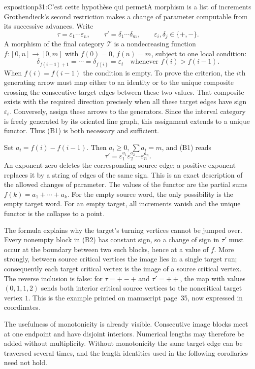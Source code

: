 \begin{dcomment}{exposition}{p31:C'est cette hypothèse qui permet}{A morphism is a list of increments}
Grothendieck's second restriction makes a change of parameter computable from its successive advances. Write
\[
 \tau=\varepsilon_1\cdots\varepsilon_n,\qquad
 \tau'=\delta_1\cdots\delta_m,
 \qquad\varepsilon_i,\delta_j\in\{+,-\}.
\]
A morphism of the final category $\mathcal T$ is a nondecreasing function
$f:[0,n]\to[0,m]$ with $f(0)=0$, $f(n)=m$, subject to one local condition:
\[
 \delta_{f(i-1)+1}=\cdots=\delta_{f(i)}=\varepsilon_i
 \quad\text{whenever }f(i)>f(i-1).                 \tag{B1}
\]
When $f(i)=f(i-1)$ the condition is empty. To prove the criterion, the $i$th generating arrow must map either to an identity or to the unique composite crossing the consecutive target edges between these two values. That composite exists with the required direction precisely when all these target edges have sign $\varepsilon_i$. Conversely, assign these arrows to the generators. Since the interval category is freely generated by its oriented line graph, this assignment extends to a unique functor. Thus (B1) is both necessary and sufficient.

Set $a_i=f(i)-f(i-1)$. Then $a_i\geq0$, $\sum a_i=m$, and (B1) reads
\[
 \tau'=\varepsilon_1^{a_1}\varepsilon_2^{a_2}\cdots
          \varepsilon_n^{a_n}.                    \tag{B2}
\]
An exponent zero deletes the corresponding source edge; a positive exponent replaces it by a string of edges of the same sign. This is an exact description of the allowed changes of parameter. The values of the functor are the partial sums
$f(k)=a_1+\cdots+a_k$. For the empty source word, the only possibility is the empty target word. For an empty target, all increments vanish and the unique functor is the collapse to a point.

The formula explains why the target's turning vertices cannot be jumped over. Every nonempty block in (B2) has constant sign, so a change of sign in $\tau'$ must occur at the boundary between two such blocks, hence at a value of $f$. More strongly, between source critical vertices the image lies in a single target run; consequently each target critical vertex is the image of a source critical vertex. The reverse inclusion is false: for $\tau=+-+$ and $\tau'=++$, the map with values $(0,1,1,2)$ sends both interior critical source vertices to the noncritical target vertex $1$. This is the example printed on manuscript page~35, now expressed in coordinates.

The usefulness of monotonicity is already visible. Consecutive image blocks meet at one endpoint and have disjoint interiors. Numerical lengths may therefore be added without multiplicity. Without monotonicity the same target edge can be traversed several times, and the length identities used in the following corollaries need not hold.
\end{dcomment}

